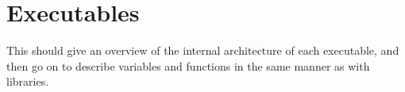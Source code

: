 
\chapter{Executables}
\label{progs}


This should give an overview of the internal architecture of each executable,
and then go on to describe variables and functions in the same manner as with
libraries.

%
